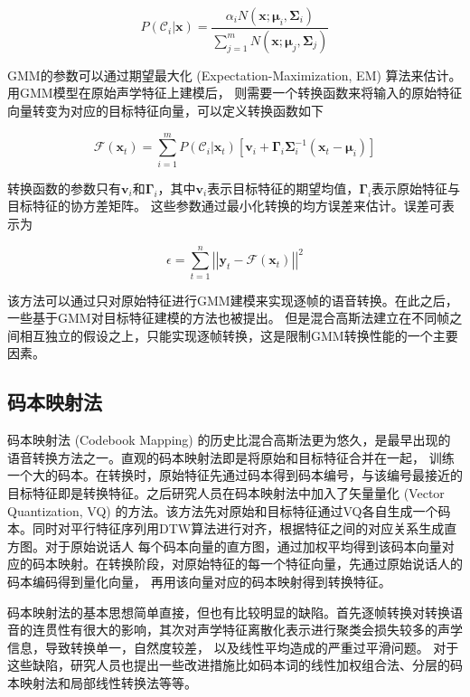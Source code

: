 \begin{equation}
    P(\mathcal{C}_i|\mathbf{x})=\frac{\alpha_iN(\mathbf{x};\bm{\mu}_i,\bm{\Sigma}_i)}{\sum^m_{j=1}N(\mathbf{x};\bm{\mu}_j,\bm{\Sigma}_j)}
\end{equation}

GMM的参数可以通过期望最大化 (Expectation-Maximization, EM) 算法来估计。用GMM模型在原始声学特征上建模后，
则需要一个转换函数来将输入的原始特征向量转变为对应的目标特征向量，可以定义转换函数如下

\begin{equation}
    \mathcal{F}(\mathbf{x}_t) = \sum^m_{i=1}P(\mathcal{C}_i|\mathbf{x}_t)\left[ \mathbf{v}_i + \bm{\Gamma}_i \bm{\Sigma}_i^{-1} (\mathbf{x}_t-\bm{\mu}_i) \right]
\end{equation}

转换函数的参数只有$\mathbf{v}_i$和$\bm{\Gamma}_i$，其中$\mathbf{v}_i$表示目标特征的期望均值，$\bm{\Gamma}_i$表示原始特征与目标特征的协方差矩阵。
这些参数通过最小化转换的均方误差来估计。误差可表示为

\begin{equation}
    \epsilon = \sum^n_{t=1} \left| \left| \mathbf{y}_t - \mathcal{F}(\mathbf{x}_t) \right| \right|^2
\end{equation}

该方法可以通过只对原始特征进行GMM建模来实现逐帧的语音转换。在此之后，一些基于GMM对目标特征建模的方法也被提出\cite{kain1998spectral}。
但是混合高斯法建立在不同帧之间相互独立的假设之上，只能实现逐帧转换，这是限制GMM转换性能的一个主要因素。

\subsection{码本映射法}
码本映射法 (Codebook Mapping) 的历史比混合高斯法更为悠久，是最早出现的语音转换方法之一。直观的码本映射法即是将原始和目标特征合并在一起，
训练一个大的码本。在转换时，原始特征先通过码本得到码本编号，与该编号最接近的目标特征即是转换特征。之后研究人员在码本映射法中加入了矢量量化 (Vector Quantization, VQ) 
的方法。该方法先对原始和目标特征通过VQ各自生成一个码本。同时对平行特征序列用DTW算法进行对齐，根据特征之间的对应关系生成直方图。对于原始说话人
每个码本向量的直方图，通过加权平均得到该码本向量对应的码本映射。在转换阶段，对原始特征的每一个特征向量，先通过原始说话人的码本编码得到量化向量，
再用该向量对应的码本映射得到转换特征。

码本映射法的基本思想简单直接，但也有比较明显的缺陷。首先逐帧转换对转换语音的连贯性有很大的影响，其次对声学特征离散化表示进行聚类会损失较多的声学信息，导致转换单一，自然度较差，
以及线性平均造成的严重过平滑问题。
对于这些缺陷，研究人员也提出一些改进措施比如码本词的线性加权组合法、分层的码本映射法和局部线性转换法等等。

